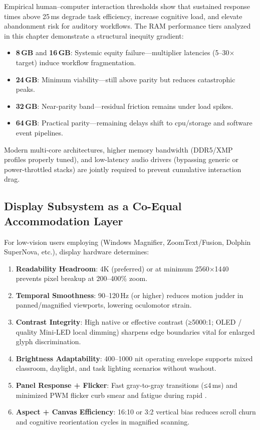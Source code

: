 Empirical human–computer interaction thresholds show that sustained response times above 25\,ms degrade task efficiency, increase cognitive load, and elevate abandonment risk for auditory  workflows. The RAM performance tiers analyzed in this chapter demonstrate a structural inequity gradient:
\begin{itemize}
	\item \textbf{8\,GB} and \textbf{16\,GB}: Systemic equity failure—multiplier latencies (5–30$\times$ target) induce workflow fragmentation.
	\item \textbf{24\,GB}: Minimum viability—still above parity but reduces catastrophic peaks.
	\item \textbf{32\,GB}: Near-parity band—residual friction remains under load spikes.
	\item \textbf{64\,GB}: Practical parity—remaining delays shift to \gls{cpu}/storage and software event pipelines.
\end{itemize}
Modern multi-core architectures, higher memory bandwidth (DDR5/XMP profiles properly tuned), and low-latency audio drivers (bypassing generic or power-throttled stacks) are jointly required to prevent cumulative interaction drag.

\subsection*{Display Subsystem as a Co-Equal Accommodation Layer}

For low-vision users employing  (Windows Magnifier, ZoomText/Fusion, Dolphin SuperNova, etc.), display hardware determines:
\begin{enumerate}
	\item \textbf{Readability Headroom}: 4K (preferred) or at minimum 2560×1440 prevents pixel breakup at 200–400\% zoom.
	\item \textbf{Temporal Smoothness}: 90–120\,Hz (or higher) reduces motion judder in panned/magnified viewports, lowering oculomotor strain.
	\item \textbf{Contrast Integrity}: High native or effective contrast (≥5000:1; OLED / quality Mini‑LED local dimming) sharpens edge boundaries vital for enlarged glyph discrimination.
	\item \textbf{Brightness Adaptability}: 400–1000 nit operating envelope supports mixed classroom, daylight, and task lighting scenarios without washout.
	\item \textbf{Panel Response + Flicker}: Fast gray-to-gray transitions (≤4\,ms) and minimized PWM flicker curb smear and fatigue during rapid .
	\item \textbf{Aspect + Canvas Efficiency}: 16:10 or 3:2 vertical bias reduces scroll churn and cognitive reorientation cycles in magnified scanning.
\end{enumerate}

